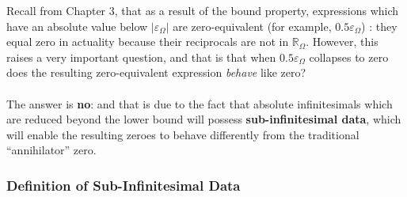 \documentclass{article}
\begin{document}
Recall from Chapter 3, that as a result of the bound property, expressions which have an absolute value below $|\varepsilon_\Omega|$ are zero-equivalent (for example, $0.5\varepsilon_\Omega$) : they equal zero in actuality because their reciprocals are not in $\mathbb{R}_\Omega$. However, this raises a very important question, and that is that when $0.5\varepsilon_\Omega$ collapses to zero does the resulting zero-equivalent expression \textit{behave} like zero?
\\\\The answer is \textbf{no}: and that is due to the fact that absolute infinitesimals which are reduced beyond the lower bound will possess \textbf{sub-infinitesimal data}, which will enable the resulting zeroes to behave differently from the traditional ``annihilator'' zero. 

\subsubsection*{Definition of Sub-Infinitesimal Data} 
\end{document}
